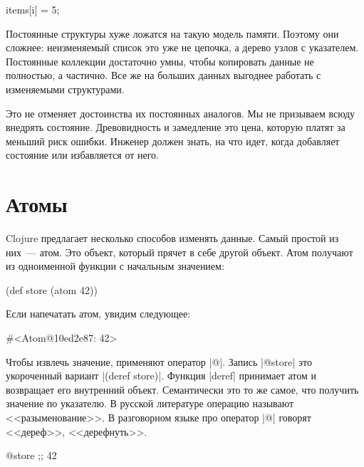 \begin{english}
  \begin{python}
items[i] = 5;
  \end{python}
\end{english}

Постоянные структуры хуже ложатся на такую модель памяти. Поэтому они сложнее:
неизменяемый список это уже не цепочка, а дерево узлов с указателем. Постоянные
коллекции достаточно умны, чтобы копировать данные не полностью, а частично. Все
же на больших данных выгоднее работать с изменяемыми структурами.

Это не отменяет достоинства их постоянных аналогов. Мы не призываем всюду
внедрять состояние. Древовидность и замедление это цена, которую платят за
меньший риск ошибки. Инженер должен знать, на что идет, когда добавляет
состояние или избавляется от него.

\section{Атомы}

Clojure предлагает несколько способов изменять данные. Самый простой из них~---
атом. Это объект, который прячет в себе другой объект. Атом получают из
одноименной функции с начальным значением:

\begin{english}
  \begin{clojure}
(def store (atom 42))
  \end{clojure}
\end{english}

Если напечатать атом, увидим следующее:

\begin{english}
  \begin{clojure}
#<Atom@10ed2e87: 42>
  \end{clojure}
\end{english}

Чтобы извлечь значение, применяют оператор \spverb|@|. Запись \spverb|@store|
это укороченный вариант \spverb|(deref store)|. Функция \spverb|deref| принимает
атом и возвращает его внутренний объект. Семантически это то же самое, что
получить значение по указателю. В русской литературе операцию называют
<<разыменование>>. В разговорном языке про оператор \spverb|@| говорят
<<дереф>>, <<дерефнуть>>.

\begin{english}
  \begin{clojure}
@store ;; 42
  \end{clojure}
\end{english}

